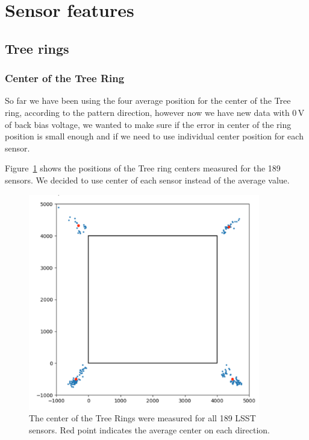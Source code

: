\section{Sensor features}\label{sensor-features}

\subsection{Tree rings}\label{tree-rings}
\subsubsection{Center of the Tree Ring}
So far we have been using the four average position for the center of the Tree ring, according to the pattern direction, however now we have new data with 0\,V of back bias voltage, we wanted to make sure if the error in center of the ring position is small enough and if we need to use individual center position for each sensor. 

Figure~\ref{fig:tree_ring_center} shows the positions of the Tree ring centers measured for the 189 sensors. We decided to use center of each sensor instead of the average value. 

\begin{figure}
\begin{centering}
\includegraphics[width=0.9\textwidth]{figures/TR_centers.png}
\end{centering}
\caption{The center of the Tree Rings were measured for all 189 LSST sensors. Red point indicates the average center on each direction.}
\label{fig:tree_ring_center}
\end{figure}

